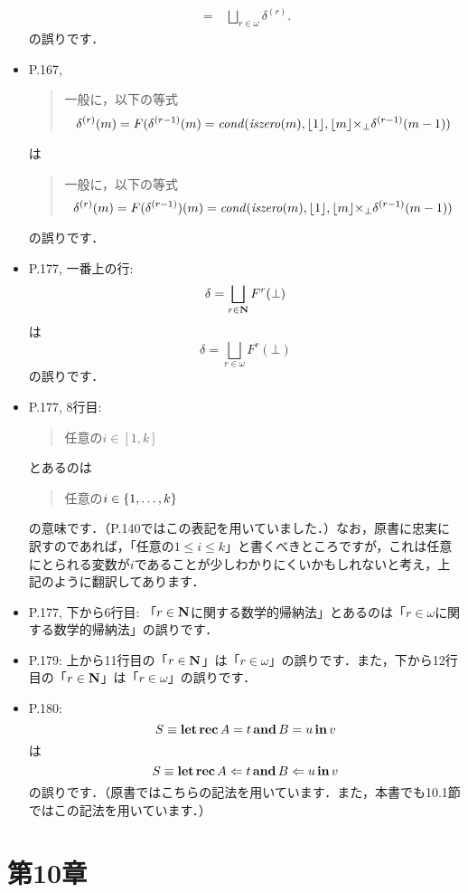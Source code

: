 \documentclass[12pt,titlepage,twoside,openright,dvipdfmx]{jsbook}
\theoremstyle{definition}
\begin{document}
\begin{itemize}
\begin{align*}
    ~=~ & \bigsqcup_{r \in \omega} \delta^{(r)}.
  \end{align*}
  の誤りです．
\item P.167,
  \begin{quote}
    一般に，以下の等式
    \[
      \delta^{(r)}(m) = F(\delta^{(r-1)}(m) = \mathit{cond}(\mathit{iszero}(m),\lfloor{1}\rfloor,\lfloor{m}\rfloor {\times}_\bot \delta^{(r-1)}(m-1))\\
    \]
  \end{quote}
  は
  \begin{quote}
    一般に，以下の等式
    \[
      \delta^{(r)}(m) = F(\delta^{(r-1)})(m) = \mathit{cond}(\mathit{iszero}(m),\lfloor{1}\rfloor,\lfloor{m}\rfloor {\times}_\bot \delta^{(r-1)}(m-1))\\
    \]
  \end{quote}
  の誤りです．
\item P.177, 一番上の行:
  \[
    \delta = \bigsqcup_{r \in \mathbf{N}} F^r(\bot)
  \]
  は
  \[
    \delta = \bigsqcup_{r \in \omega} F^r(\bot)
  \]
  の誤りです．
\item P.177, 8行目:
  \begin{quote}
    任意の$i \in [1,k]$
  \end{quote}
  とあるのは
  \begin{quote}
    任意の$i \in \left\{{1,\dots,k}\right\}$
  \end{quote}
  の意味です．（P.140ではこの表記を用いていました．）なお，原書に忠実に訳すのであれば，「任意の$1 \le i \le k$」と書くべきところですが，これは任意にとられる変数が$i$であることが少しわかりにくいかもしれないと考え，上記のように翻訳してあります．
\item P.177, 下から6行目:
  「$r \in \mathbf{N}$に関する数学的帰納法」とあるのは「$r \in \omega$に関する数学的帰納法」の誤りです．
\item P.179:
  上から11行目の「$r \in \mathbf{N}$」は「$r \in \omega$」の誤りです．また，下から12行目の「$r \in \mathbf{N}$」は「$r \in \omega$」の誤りです．
\item P.180:
  \[
    S \equiv \operatorname{\mathbf{let}} \operatorname{\mathbf{rec}} A = t \operatorname{\mathbf{and}} B = u \operatorname{\mathbf{in}} v
  \]
  は
  \[
    S \equiv \operatorname{\mathbf{let}} \operatorname{\mathbf{rec}} A \Leftarrow t \operatorname{\mathbf{and}} B \Leftarrow u \operatorname{\mathbf{in}} v
  \]
  の誤りです．（原書ではこちらの記法を用いています．また，本書でも10.1節ではこの記法を用いています．）
\end{itemize}

\section*{第10章}
\end{document}
